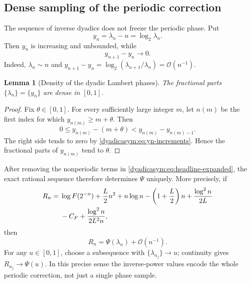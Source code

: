 \documentclass[11pt,oneside]{article}
\newtheorem{lemma}[theorem]{Lemma}
\theoremstyle{definition}
\theoremstyle{remark}
\newcommand{\bigO}{\mathcal O}
\begin{document}
\subsection{Dense sampling of the periodic correction}

The sequence of inverse dyadics does not freeze the periodic phase.  Put
\begin{equation}
 y_n=\lambda_n-n=\log_2\lambda_n.                           \label{dyadicasym:eq:yn}
\end{equation}
Then $y_n$ is increasing and unbounded, while
\begin{equation}
 y_{n+1}-y_n\longrightarrow0.                               \label{dyadicasym:eq:yn-increments}
\end{equation}
Indeed, $\lambda_n\sim n$ and
$y_{n+1}-y_n=\log_2(\lambda_{n+1}/\lambda_n)=\bigO(n^{-1})$.

\begin{lemma}[Density of the dyadic Lambert phases]
\label{dyadicasym:lem:phase-density}
The fractional parts $\{\lambda_n\}=\{y_n\}$ are dense in $[0,1]$.
\end{lemma}

\begin{proof}
Fix $\theta\in[0,1]$.  For every sufficiently large integer $m$, let $n(m)$ be the first
index for which $y_{n(m)}\ge m+\theta$.  Then
\begin{equation*}
 0\le y_{n(m)}-(m+\theta)
 <y_{n(m)}-y_{n(m)-1}.
\end{equation*}
The right side tends to zero by \eqref{dyadicasym:eq:yn-increments}.  Hence the fractional parts of
$y_{n(m)}$ tend to $\theta$.
\end{proof}

After removing the nonperiodic terms in \eqref{dyadicasym:eq:headline-expanded}, the exact rational
sequence therefore determines $\Psi$ uniquely.  More precisely, if
\begin{align}
 R_n={}&\log F(2^{-n})+\frac L2n^2+n\log n-
 \left(1+\frac L2\right)n+\frac{\log^2n}{2L}               \notag\\
 &-C_F+\frac{\log^2n}{2L^2n},                              \label{dyadicasym:eq:renormalized-Rn}
\end{align}
then
\begin{equation}
 R_n=\Psi(\lambda_n)+\bigO(n^{-1}).                         \label{dyadicasym:eq:Rn-Psi}
\end{equation}
For any $u\in[0,1]$, choose a subsequence with
$\{\lambda_{n_j}\}\to u$; continuity gives $R_{n_j}\to\Psi(u)$.  In this precise sense the
inverse-power values encode the whole periodic correction, not just a single phase sample.
\end{document}
